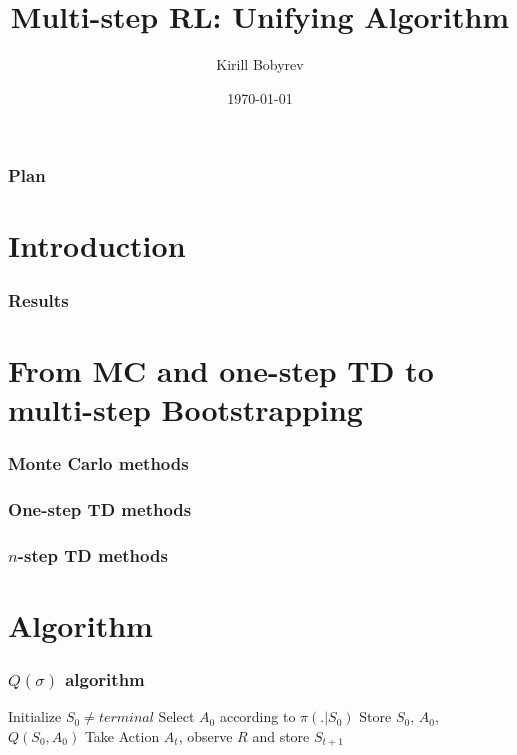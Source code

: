 \documentclass{beamer}
\title{Multi-step RL: Unifying Algorithm}
\author{Kirill Bobyrev}
\date{\today}
\begin{document}
\begin{frame}
\titlepage
\end{frame}

\begin{frame}
\frametitle{Plan}
\tableofcontents
\end{frame}


\section{Introduction}

\begin{frame}
  \frametitle{Results}
\end{frame}

\section{From MC and one-step TD to multi-step Bootstrapping}

\begin{frame}
  \frametitle{Monte Carlo methods}
\end{frame}

\begin{frame}
  \frametitle{One-step TD methods}
\end{frame}

\begin{frame}
  \frametitle{$n$-step TD methods}
\end{frame}

\section{Algorithm}

\begin{frame}
  \frametitle{$Q(\sigma)$ algorithm}
  \begin{algorithmic}
    \STATE Initialize $S_0 \neq {terminal}$
    \STATE Select $A_0$ according to $\pi(. | S_0)$
    \STATE Store $S_0$, $A_0$, $Q(S_0, A_0)$
        \STATE Take Action $A_t$, observe $R$ and store $S_{t + 1}$
      \ENDIF
    \ENDFOR
  \end{algorithmic}
\end{frame}
\end{document}
